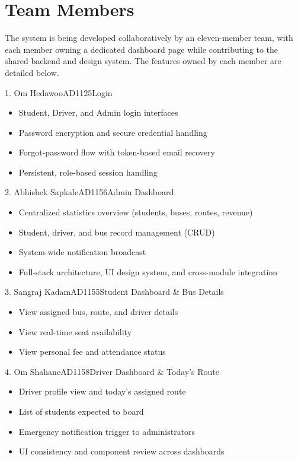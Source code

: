 \documentclass[11pt,a4paper]{report}
\begin{document}
\section{Team Members}
The system is being developed collaboratively by an eleven-member team, with each member owning a dedicated dashboard page while contributing to the shared backend and design system. The features owned by each member are detailed below.

\begin{membercard}{1. Om Hedawoo}{AD1125}{Login}
\begin{itemize}[leftmargin=1.2em, itemsep=1pt]
  \item Student, Driver, and Admin login interfaces
  \item Password encryption and secure credential handling
  \item Forgot-password flow with token-based email recovery
  \item Persistent, role-based session handling
\end{itemize}
\end{membercard}

\begin{membercard}{2. Abhishek Sapkale}{AD1156}{Admin Dashboard}
\begin{itemize}[leftmargin=1.2em, itemsep=1pt]
  \item Centralized statistics overview (students, buses, routes, revenue)
  \item Student, driver, and bus record management (CRUD)
  \item System-wide notification broadcast
  \item Full-stack architecture, UI design system, and cross-module integration
\end{itemize}
\end{membercard}

\begin{membercard}{3. Sangraj Kadam}{AD1155}{Student Dashboard \& Bus Details}
\begin{itemize}[leftmargin=1.2em, itemsep=1pt]
  \item View assigned bus, route, and driver details
  \item View real-time seat availability
  \item View personal fee and attendance status
\end{itemize}
\end{membercard}

\begin{membercard}{4. Om Shahane}{AD1158}{Driver Dashboard \& Today's Route}
\begin{itemize}[leftmargin=1.2em, itemsep=1pt]
  \item Driver profile view and today's assigned route
  \item List of students expected to board
  \item Emergency notification trigger to administrators
  \item UI consistency and component review across dashboards
\end{itemize}
\end{membercard}
\end{document}
